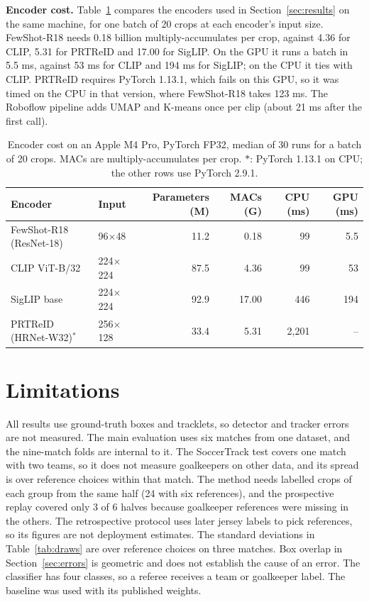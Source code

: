\documentclass[10pt]{article}
\begin{document}
\textbf{Encoder cost.} Table~\ref{tab:cost} compares the encoders used in Section~\ref{sec:results} on the same machine, for one batch of 20 crops at each encoder's input size. FewShot-R18 needs 0.18 billion multiply-accumulates per crop, against 4.36 for CLIP, 5.31 for PRTReID and 17.00 for SigLIP. On the GPU it runs a batch in 5.5 ms, against 53 ms for CLIP and 194 ms for SigLIP; on the CPU it ties with CLIP. PRTReID requires PyTorch 1.13.1, which fails on this GPU, so it was timed on the CPU in that version, where FewShot-R18 takes 123 ms. The Roboflow pipeline adds UMAP and K-means once per clip (about 21 ms after the first call).

\begin{table}[tbp]
\centering
\caption{Encoder cost on an Apple M4 Pro, PyTorch FP32, median of 30 runs for a batch of 20 crops. MACs are multiply-accumulates per crop. $\ast$: PyTorch 1.13.1 on CPU; the other rows use PyTorch 2.9.1.}
\label{tab:cost}
\small
\begin{tabular}{llrrrr}
\toprule
Encoder & Input & Parameters (M) & MACs (G) & CPU (ms) & GPU (ms) \\
\midrule
FewShot-R18 (ResNet-18) & 96$\times$48 & 11.2 & 0.18 & 99 & 5.5 \\
CLIP ViT-B/32 & 224$\times$224 & 87.5 & 4.36 & 99 & 53 \\
SigLIP base & 224$\times$224 & 92.9 & 17.00 & 446 & 194 \\
PRTReID (HRNet-W32)$^\ast$ & 256$\times$128 & 33.4 & 5.31 & 2,201 & -- \\
\bottomrule
\end{tabular}
\end{table}

\section{Limitations}

All results use ground-truth boxes and tracklets, so detector and tracker errors are not measured. The main evaluation uses six matches from one dataset, and the nine-match folds are internal to it. The SoccerTrack test covers one match with two teams, so it does not measure goalkeepers on other data, and its spread is over reference choices within that match. The method needs labelled crops of each group from the same half (24 with six references), and the prospective replay covered only 3 of 6 halves because goalkeeper references were missing in the others. The retrospective protocol uses later jersey labels to pick references, so its figures are not deployment estimates. The standard deviations in Table~\ref{tab:draws} are over reference choices on three matches. Box overlap in Section~\ref{sec:errors} is geometric and does not establish the cause of an error. The classifier has four classes, so a referee receives a team or goalkeeper label. The baseline was used with its published weights.



\end{document}
